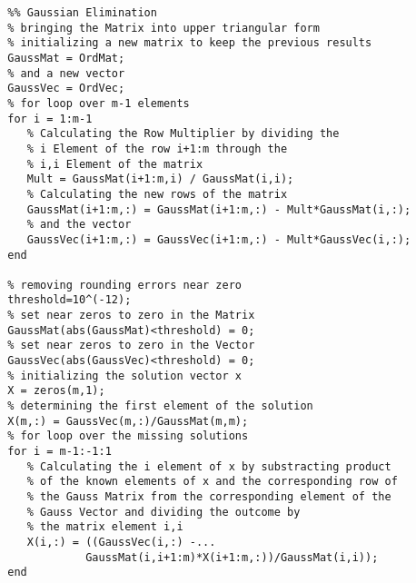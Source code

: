 \begin{code}
    \label{code:GaussElem}
    \begin{verbatim}
		%% Gaussian Elimination
		% bringing the Matrix into upper triangular form
		% initializing a new matrix to keep the previous results
		GaussMat = OrdMat;
		% and a new vector
		GaussVec = OrdVec;
		% for loop over m-1 elements
		for i = 1:m-1
		   % Calculating the Row Multiplier by dividing the
		   % i Element of the row i+1:m through the
		   % i,i Element of the matrix
		   Mult = GaussMat(i+1:m,i) / GaussMat(i,i);
		   % Calculating the new rows of the matrix
		   GaussMat(i+1:m,:) = GaussMat(i+1:m,:) - Mult*GaussMat(i,:);
		   % and the vector
		   GaussVec(i+1:m,:) = GaussVec(i+1:m,:) - Mult*GaussVec(i,:);
		end

		% removing rounding errors near zero
		threshold=10^(-12);
		% set near zeros to zero in the Matrix
		GaussMat(abs(GaussMat)<threshold) = 0;
		% set near zeros to zero in the Vector
		GaussVec(abs(GaussVec)<threshold) = 0;
		% initializing the solution vector x
		X = zeros(m,1);
		% determining the first element of the solution
		X(m,:) = GaussVec(m,:)/GaussMat(m,m);
		% for loop over the missing solutions
		for i = m-1:-1:1
		   % Calculating the i element of x by substracting product
		   % of the known elements of x and the corresponding row of
		   % the Gauss Matrix from the corresponding element of the
		   % Gauss Vector and dividing the outcome by
		   % the matrix element i,i
		   X(i,:) = ((GaussVec(i,:) -...
					GaussMat(i,i+1:m)*X(i+1:m,:))/GaussMat(i,i));
		end
	\end{verbatim}
\end{code}